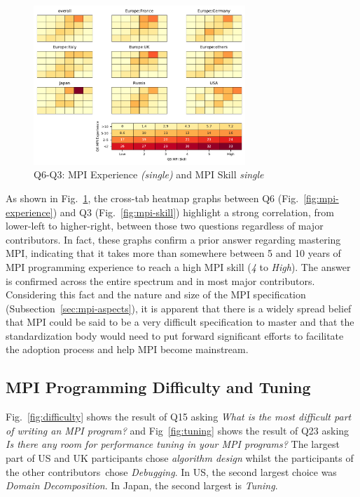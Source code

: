 \documentclass[preprint,5p,times]{elsarticle}
\def\myquote#1{{\it #1}}
\newcommand{\revision}[2]{{\color{blue}#2}}
\def\countries{contributors\xspace{}}%
\def\mcountries{major contributors\xspace{}}%
\begin{document}
\begin{figure}[tb]
\begin{center}
\includegraphics[width=8.0cm]{Figs/Q6-Q3.pdf}
\vspace{-1.5mm}
\caption{Q6-Q3: MPI Experience {\it(single)} and MPI Skill {\it single}}
\label{fig:experience-and-skill}
\vspace{-3mm}%
\end{center}
\end{figure}

As shown in Fig.~\ref{fig:experience-and-skill}, the cross-tab heatmap graphs
between Q6 (Fig.~\ref{fig:mpi-experience}) and Q3 \revision{(Fig.~\ref{fig:mpi-skill}),}{(Fig.~\ref{fig:mpi-skill})}
highlight a strong correlation, from lower-left to higher-right, between those
two questions regardless of \mcountries. In fact, these graphs confirm a prior
answer regarding mastering MPI, indicating that it takes more than somewhere
between 5 and 10 years of MPI programming experience to reach a high MPI skill
(\myquote{4} to \myquote{High}). The answer is confirmed across the entire
spectrum and in most \mcountries.
Considering this fact and the nature and size of the MPI specification
(Subsection~\ref{sec:mpi-aspects}), it is apparent that there is a widely
spread belief that MPI could be said to be a very difficult specification to
master and that the standardization body would need to put forward significant
efforts to facilitate the adoption process and help MPI become mainstream.

\subsection{MPI Programming Difficulty and Tuning}

Fig.~\ref{fig:difficulty} shows the result of Q15 asking \myquote{What is the
most difficult part of writing an MPI program?} and
Fig~\ref{fig:tuning} shows the result of Q23 asking \myquote{Is there any
room for performance tuning in your MPI programs?} The largest part
of US and UK participants chose \myquote{algorithm design} whilst the
participants of the other \countries\  chose
\myquote{Debugging}. In US, the second largest choice was
\myquote{Domain Decomposition}. In Japan, the second largest is
\myquote{Tuning}.
\end{document}
